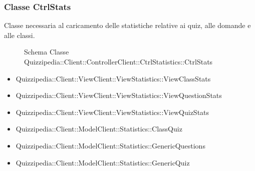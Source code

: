 \subsubsection{Classe CtrlStats}
Classe necessaria al caricamento delle statistiche relative ai quiz, alle domande e alle classi.
\begin{figure}[H]
\centering
\noindent{}
\caption[Schema Classe CtrlStats]{Schema Classe Quizzipedia::Client::ControllerClient::CtrlStatistics::CtrlStats}
\end{figure}
\begin{itemize}
\item Quizzipedia::Client::ViewClient::ViewStatistics::ViewClassStats
\item Quizzipedia::Client::ViewClient::ViewStatistics::ViewQuestionStats
\item Quizzipedia::Client::ViewClient::ViewStatistics::ViewQuizStats
\end{itemize}
\begin{itemize}
\item Quizzipedia::Client::ModelClient::Statistics::ClassQuiz
\item Quizzipedia::Client::ModelClient::Statistics::GenericQuestions
\item Quizzipedia::Client::ModelClient::Statistics::GenericQuiz
\end{itemize}
